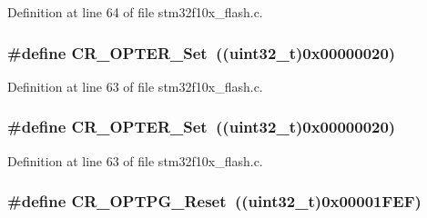 Definition at line 64 of file stm32f10x\+\_\+flash.\+c.

\subsubsection[{\texorpdfstring{C\+R\+\_\+\+O\+P\+T\+E\+R\+\_\+\+Set}{CR_OPTER_Set}}]{\setlength{\rightskip}{0pt plus 5cm}\#define C\+R\+\_\+\+O\+P\+T\+E\+R\+\_\+\+Set~(({\bf uint32\+\_\+t})0x00000020)}\hypertarget{group___f_l_a_s_h___private___defines_gac5707368555a5b7400eea1e306b62b16}{}\label{group___f_l_a_s_h___private___defines_gac5707368555a5b7400eea1e306b62b16}


Definition at line 63 of file stm32f10x\+\_\+flash.\+c.

\subsubsection[{\texorpdfstring{C\+R\+\_\+\+O\+P\+T\+E\+R\+\_\+\+Set}{CR_OPTER_Set}}]{\setlength{\rightskip}{0pt plus 5cm}\#define C\+R\+\_\+\+O\+P\+T\+E\+R\+\_\+\+Set~(({\bf uint32\+\_\+t})0x00000020)}\hypertarget{group___f_l_a_s_h___private___defines_gac5707368555a5b7400eea1e306b62b16}{}\label{group___f_l_a_s_h___private___defines_gac5707368555a5b7400eea1e306b62b16}


Definition at line 63 of file stm32f10x\+\_\+flash.\+c.

\subsubsection[{\texorpdfstring{C\+R\+\_\+\+O\+P\+T\+P\+G\+\_\+\+Reset}{CR_OPTPG_Reset}}]{\setlength{\rightskip}{0pt plus 5cm}\#define C\+R\+\_\+\+O\+P\+T\+P\+G\+\_\+\+Reset~(({\bf uint32\+\_\+t})0x00001\+F\+E\+F)}\hypertarget{group___f_l_a_s_h___private___defines_ga9dd2ca46f4e8edfa098e1481699c08b7}{}\label{group___f_l_a_s_h___private___defines_ga9dd2ca46f4e8edfa098e1481699c08b7}


